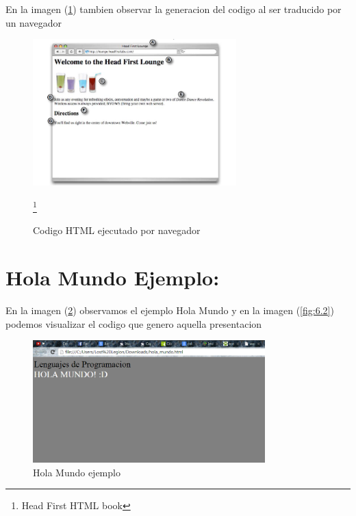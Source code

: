 \documentclass[11pt]{article} %
\begin{document}
\singlespace

\begin{center}
En la imagen (\ref{fig:5.2}) tambien observar la generacion del codigo al ser traducido por un navegador
\end{center}

\begin{figure}[htb]
\centering
\includegraphics[width=0.7\textwidth]{imagenes/img2.png}
\caption{Codigo HTML ejecutado por navegador}
\label{fig:5.2}
\footnote{Head First HTML book}
\end{figure}


\section{Hola Mundo Ejemplo:}

\begin{center}
En la imagen (\ref{fig:6.1}) observamos el ejemplo Hola Mundo y en la imagen  (\ref{fig:6.2}) podemos visualizar el codigo que genero aquella presentacion
\end{center}


\begin{figure}[htb]
\centering
\includegraphics[width=0.8\textwidth]{imagenes/Hola_Mundo.png}
\caption{Hola Mundo ejemplo}
\label{fig:6.1}
\end{figure}
\end{document}
